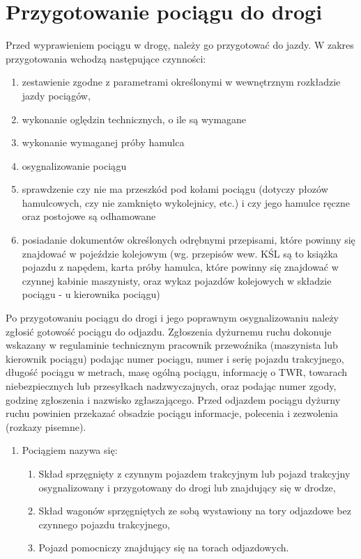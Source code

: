 \section{Przygotowanie pociągu do drogi}

Przed wyprawieniem pociągu w drogę, należy go przygotować do jazdy. W zakres przygotowania wchodzą następujące czynności:

\begin{enumerate}
\item zestawienie zgodne z parametrami określonymi w wewnętrznym rozkładzie jazdy pociągów,
\item wykonanie oględzin technicznych, o ile są wymagane
\item wykonanie wymaganej próby hamulca
\item osygnalizowanie pociągu
\item sprawdzenie czy nie ma przeszkód pod kołami pociągu (dotyczy płozów hamulcowych, czy nie zamknięto wykolejnicy,
etc.) i czy jego hamulce ręczne oraz postojowe są odhamowane
\item posiadanie dokumentów określonych odrębnymi przepisami, które powinny się znajdować w pojeździe kolejowym (wg. przepisów wew. KŚL są to książka pojazdu z napędem, karta próby hamulca, które powinny się znajdować w czynnej kabinie maszynisty, oraz wykaz pojazdów kolejowych w składzie pociągu - u kierownika pociągu)
\end{enumerate}
Po przygotowaniu pociągu do drogi i jego poprawnym osygnalizowaniu należy zgłosić gotowość pociągu do odjazdu. Zgłoszenia dyżurnemu ruchu dokonuje wskazany w regulaminie technicznym pracownik przewoźnika (maszynista lub kierownik pociągu) podając numer pociągu, numer i serię pojazdu trakcyjnego, długość pociągu w metrach, masę ogólną pociągu, informację o TWR, towarach niebezpiecznych lub przesyłkach nadzwyczajnych, oraz podając numer zgody, godzinę zgłoszenia i nazwisko zgłaszającego. Przed odjazdem pociągu dyżurny ruchu powinien przekazać obsadzie pociągu informacje, polecenia i zezwolenia (rozkazy pisemne).

\begin{tcolorbox}[colback=black!5!white,colframe=white!55!black,title=Sprawdźmy się]
	\begin{enumerate}
		\item Pociągiem nazywa się:
		\begin{enumerate}
			\item Skład sprzęgnięty z czynnym pojazdem trakcyjnym lub pojazd trakcyjny osygnalizowany i przygotowany do drogi lub znajdujący się w drodze,
			\item Skład wagonów sprzęgniętych ze sobą wystawiony na tory odjazdowe bez czynnego pojazdu trakcyjnego,
			\item Pojazd pomocniczy znajdujący się na torach odjazdowych.
		\end{enumerate}
	\end{enumerate}
\end{tcolorbox}

